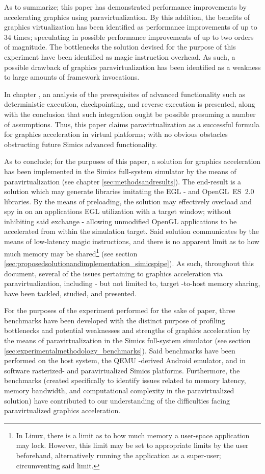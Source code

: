 As to summarize; this paper has demonstrated performance improvements by accelerating graphics using paravirtualization.
By this addition, the benefits of graphics virtualization has been identified as performance improvements of up to $34$ times; speculating in possible performance improvements of up to two orders of magnitude.
The bottlenecks the solution devised for the purpose of this experiment have been identified as magic instruction overhead.
As such, a possible drawback of graphics paravirtualization has been identified as a weakness to large amounts of framework invocations.

In chapter , an analysis of the prerequisites of advanced functionality such as deterministic execution, checkpointing, and reverse execution is presented, along with the conclusion that such integration ought be possible presuming a number of assumptions.
Thus, this paper claims paravirtualization as a successful formula for graphics acceleration in virtual platforms; with no obvious obstacles obstructing future Simics advanced functionality.

As to conclude; for the purposes of this paper, a solution for graphics acceleration has been implemented in the Simics full-system simulator by the means of paravirtualization (see chapter \ref{sec:methodsandresults}).
The end-result is a solution which may generate libraries imitating the EGL - and OpenGL~ES~$2.0$ libraries.
By the means of preloading, the solution may effectively overload and spy in on an applications EGL utilization with a target window; without inhibiting said exchange - allowing unmodified OpenGL applications to be accelerated from within the simulation target.
Said solution communicates by the means of low-latency magic instructions, and there is no apparent limit as to how much memory may be shared\footnote{In Linux, there is a limit as to how much memory a user-space application may lock. However, this limit may be set to appropriate limits by the user beforehand, alternatively running the application as a super-user; circumventing said limit.} (see section \ref{sec:proposedsolutionandimplementation_simicspipe}).
As such, throughout this document, several of the issues pertaining to graphics acceleration via paravirtualization, including - but not limited to, target -to-host memory sharing, have been tackled, studied, and presented.

For the purposes of the experiment performed for the sake of paper, three benchmarks have been developed with the distinct purpose of profiling bottlenecks and potential weaknesses and strengths of graphics acceleration by the means of paravirtualization in the Simics full-system simulator (see section \ref{sec:experimentalmethodology_benchmarks}).
Said benchmarks have been performed on the host system, the QEMU -derived Android emulator, and in software rasterized- and paravirtualized Simics platforms.
Furthermore, the benchmarks (created specifically to identify issues related to memory latency, memory bandwidth, and computational complexity in the paravirtualized solution) have contributed to our understanding of the difficulties facing paravirtualized graphics acceleration.

